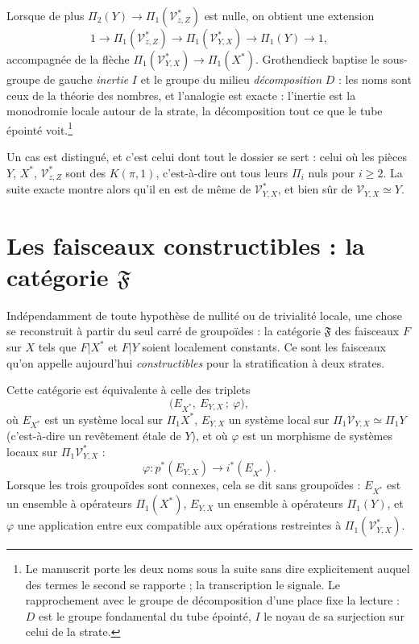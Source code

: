 \documentclass[11pt,a4paper]{article}
\begin{document}
Lorsque de plus $\Pi_{2}(Y) \to \Pi_{1}(\mathcal{V}^{*}_{z,Z})$ est nulle, on
obtient une extension
\[
  1 \longrightarrow \Pi_{1}(\mathcal{V}^{*}_{z,Z}) \longrightarrow
  \Pi_{1}(\mathcal{V}^{*}_{Y,X}) \longrightarrow \Pi_{1}(Y)
  \longrightarrow 1,
\]
accompagnée de la flèche $\Pi_{1}(\mathcal{V}^{*}_{Y,X}) \to \Pi_{1}(X^{*})$.
Grothendieck baptise le sous-groupe de gauche \emph{inertie} $I$ et le groupe du
milieu \emph{décomposition} $D$ : les noms sont ceux de la théorie des nombres,
et l'analogie est exacte : l'inertie est la monodromie locale autour de la
strate, la décomposition tout ce que le tube épointé
voit.\footnote{Le manuscrit porte les deux noms sous la suite sans dire
explicitement auquel des termes le second se rapporte ; la transcription le
signale. Le rapprochement avec le groupe de décomposition d'une place fixe la
lecture : $D$ est le groupe fondamental du tube épointé, $I$ le noyau de sa
surjection sur celui de la strate.}

Un cas est distingué, et c'est celui dont tout le dossier se sert : celui où les
pièces $Y$, $X^{*}$, $\mathcal{V}^{*}_{z,Z}$ sont des $K(\pi,1)$, c'est-à-dire
ont tous leurs $\Pi_{i}$ nuls pour $i \geq 2$. La suite exacte montre alors
qu'il en est de même de $\mathcal{V}^{*}_{Y,X}$, et bien sûr de
$\mathcal{V}_{Y,X} \simeq Y$.

\section*{Les faisceaux constructibles : la catégorie $\mathfrak{F}$}

Indépendamment de toute hypothèse de nullité ou de trivialité locale, une chose
se reconstruit à partir du seul carré de groupoïdes : la catégorie
$\mathfrak{F}$ des faisceaux $F$ sur $X$ tels que $F|X^{*}$ et $F|Y$ soient
localement constants. Ce sont les faisceaux qu'on appelle aujourd'hui
\emph{constructibles} pour la stratification à deux strates.

Cette catégorie est équivalente à celle des triplets
\[
  \bigl(E_{X^{*}},\ E_{Y,X}\,;\ \varphi\bigr),
\]
où $E_{X^{*}}$ est un système local sur $\Pi_{1}X^{*}$, $E_{Y,X}$ un système
local sur $\Pi_{1}\mathcal{V}_{Y,X} \simeq \Pi_{1}Y$ (c'est-à-dire un
revêtement étale de $Y$), et où $\varphi$ est un morphisme de systèmes locaux
sur $\Pi_{1}\mathcal{V}^{*}_{Y,X}$ :
\[
  \varphi \colon p^{*}(E_{Y,X}) \longrightarrow i^{*}(E_{X^{*}}).
\]
Lorsque les trois groupoïdes sont connexes, cela se dit sans groupoïdes :
$E_{X^{*}}$ est un ensemble à opérateurs $\Pi_{1}(X^{*})$, $E_{Y,X}$ un
ensemble à opérateurs $\Pi_{1}(Y)$, et $\varphi$ une application entre eux
compatible aux opérations restreintes à $\Pi_{1}(\mathcal{V}^{*}_{Y,X})$.
\end{document}
